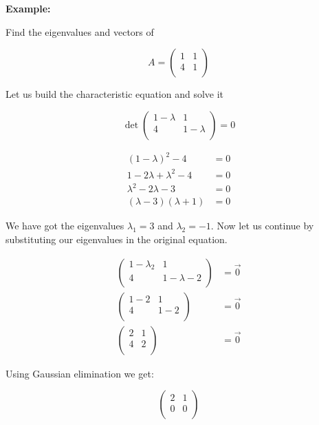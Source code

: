 \textbf{Example:}
\vspace{\baselineskip}

Find the eigenvalues and vectors of 

\[
    A = \begin{pmatrix}
        1 & 1 \\
        4 & 1 \\
    \end{pmatrix}
\]

Let us build the characteristic equation and solve it

\[
    \det 
    \begin{pmatrix}
        1 - \lambda & 1 \\
        4 & 1 - \lambda \\
    \end{pmatrix}
    = 0
\]

\begin{align*}
    (1 - \lambda)^2 - 4 &= 0 \\
    1 - 2\lambda + \lambda^2 - 4 &= 0 \\
    \lambda^2 - 2\lambda - 3 &= 0 \\
    (\lambda - 3) (\lambda + 1) &= 0 
\end{align*}

We have got the eigenvalues \(\lambda_1 = 3\) and \(\lambda_2 = -1\). Now let us continue by 
substituting our eigenvalues in the original equation.

\begin{align*}
    \begin{pmatrix} 1 - \lambda_2 & 1 \\ 4 & 1 - \lambda-2 \\ \end{pmatrix} &= \vec{0} \\
    \begin{pmatrix} 1 - 2 & 1 \\ 4 & 1 - 2 \\ \end{pmatrix} &= \vec{0} \\
    \begin{pmatrix} 2 & 1 \\ 4 & 2 \\ \end{pmatrix} &= \vec{0} 
\end{align*}

Using Gaussian elimination we get: 

\[
    \begin{pmatrix} 
        2 & 1 \\ 
        0 & 0 \\ 
    \end{pmatrix} 
\]

